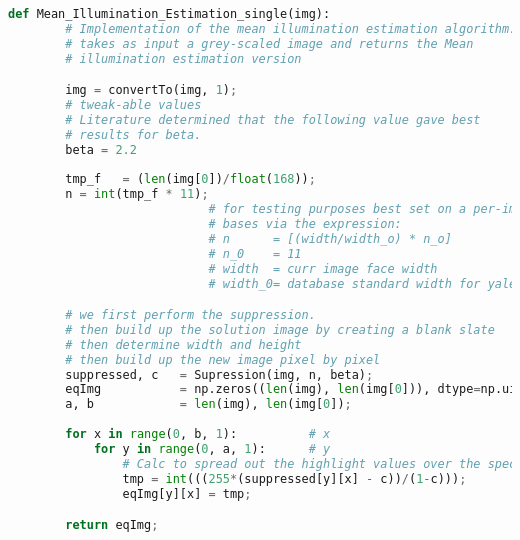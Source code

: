 \newpage

\begin{lstlisting}[language=Python, caption = MIE Implementation listing 2\label{Listing:2} ]
	def Mean_Illumination_Estimation_single(img):
		# Implementation of the mean illumination estimation algorithm.
		# takes as input a grey-scaled image and returns the Mean
		# illumination estimation version

		img = convertTo(img, 1);
		# tweak-able values
		# Literature determined that the following value gave best 
		# results for beta.
		beta = 2.2
		
		tmp_f   = (len(img[0])/float(168));
		n = int(tmp_f * 11);  	
							# for testing purposes best set on a per-image  
							# bases via the expression:
							# n 	 = [(width/width_o) * n_o]
							# n_0    = 11
							# width  = curr image face width
							# width_0= database standard width for yale=(168)

		# we first perform the suppression.
		# then build up the solution image by creating a blank slate
		# then determine width and height
		# then build up the new image pixel by pixel
		suppressed, c   = Supression(img, n, beta);
		eqImg           = np.zeros((len(img), len(img[0])), dtype=np.uint8);
		a, b            = len(img), len(img[0]);  
		
		for x in range(0, b, 1):          # x
			for y in range(0, a, 1):	  # y
				# Calc to spread out the highlight values over the spectrum
				tmp = int(((255*(suppressed[y][x] - c))/(1-c)));
				eqImg[y][x] = tmp;

		return eqImg;
\end{lstlisting}

